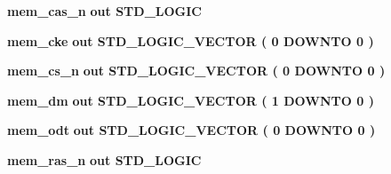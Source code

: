 \begin{DoxyCompactItemize}
\item 
{\bf mem\+\_\+cas\+\_\+n}  {\bfseries {\bfseries \textcolor{keywordflow}{out}\textcolor{vhdlchar}{ }}} {\bfseries \textcolor{comment}{S\+T\+D\+\_\+\+L\+O\+G\+IC}\textcolor{vhdlchar}{ }} 
\item 
{\bf mem\+\_\+cke}  {\bfseries {\bfseries \textcolor{keywordflow}{out}\textcolor{vhdlchar}{ }}} {\bfseries \textcolor{comment}{S\+T\+D\+\_\+\+L\+O\+G\+I\+C\+\_\+\+V\+E\+C\+T\+OR}\textcolor{vhdlchar}{ }\textcolor{vhdlchar}{(}\textcolor{vhdlchar}{ }\textcolor{vhdlchar}{ } \textcolor{vhdldigit}{0} \textcolor{vhdlchar}{ }\textcolor{keywordflow}{D\+O\+W\+N\+TO}\textcolor{vhdlchar}{ }\textcolor{vhdlchar}{ } \textcolor{vhdldigit}{0} \textcolor{vhdlchar}{ }\textcolor{vhdlchar}{)}\textcolor{vhdlchar}{ }} 
\item 
{\bf mem\+\_\+cs\+\_\+n}  {\bfseries {\bfseries \textcolor{keywordflow}{out}\textcolor{vhdlchar}{ }}} {\bfseries \textcolor{comment}{S\+T\+D\+\_\+\+L\+O\+G\+I\+C\+\_\+\+V\+E\+C\+T\+OR}\textcolor{vhdlchar}{ }\textcolor{vhdlchar}{(}\textcolor{vhdlchar}{ }\textcolor{vhdlchar}{ } \textcolor{vhdldigit}{0} \textcolor{vhdlchar}{ }\textcolor{keywordflow}{D\+O\+W\+N\+TO}\textcolor{vhdlchar}{ }\textcolor{vhdlchar}{ } \textcolor{vhdldigit}{0} \textcolor{vhdlchar}{ }\textcolor{vhdlchar}{)}\textcolor{vhdlchar}{ }} 
\item 
{\bf mem\+\_\+dm}  {\bfseries {\bfseries \textcolor{keywordflow}{out}\textcolor{vhdlchar}{ }}} {\bfseries \textcolor{comment}{S\+T\+D\+\_\+\+L\+O\+G\+I\+C\+\_\+\+V\+E\+C\+T\+OR}\textcolor{vhdlchar}{ }\textcolor{vhdlchar}{(}\textcolor{vhdlchar}{ }\textcolor{vhdlchar}{ } \textcolor{vhdldigit}{1} \textcolor{vhdlchar}{ }\textcolor{keywordflow}{D\+O\+W\+N\+TO}\textcolor{vhdlchar}{ }\textcolor{vhdlchar}{ } \textcolor{vhdldigit}{0} \textcolor{vhdlchar}{ }\textcolor{vhdlchar}{)}\textcolor{vhdlchar}{ }} 
\item 
{\bf mem\+\_\+odt}  {\bfseries {\bfseries \textcolor{keywordflow}{out}\textcolor{vhdlchar}{ }}} {\bfseries \textcolor{comment}{S\+T\+D\+\_\+\+L\+O\+G\+I\+C\+\_\+\+V\+E\+C\+T\+OR}\textcolor{vhdlchar}{ }\textcolor{vhdlchar}{(}\textcolor{vhdlchar}{ }\textcolor{vhdlchar}{ } \textcolor{vhdldigit}{0} \textcolor{vhdlchar}{ }\textcolor{keywordflow}{D\+O\+W\+N\+TO}\textcolor{vhdlchar}{ }\textcolor{vhdlchar}{ } \textcolor{vhdldigit}{0} \textcolor{vhdlchar}{ }\textcolor{vhdlchar}{)}\textcolor{vhdlchar}{ }} 
\item 
{\bf mem\+\_\+ras\+\_\+n}  {\bfseries {\bfseries \textcolor{keywordflow}{out}\textcolor{vhdlchar}{ }}} {\bfseries \textcolor{comment}{S\+T\+D\+\_\+\+L\+O\+G\+IC}\textcolor{vhdlchar}{ }} 

\end{DoxyCompactItemize}
